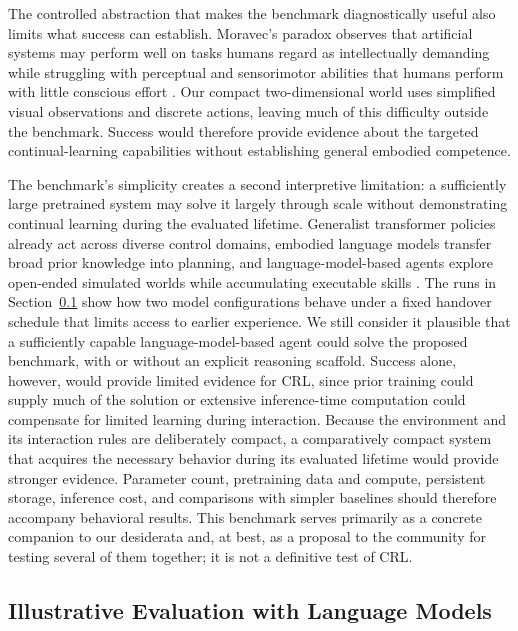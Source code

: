 \documentclass[10pt,journal,compsoc]{IEEEtran}
\begin{document}
The controlled abstraction that makes the benchmark diagnostically useful also limits what success can establish.
Moravec's paradox observes that artificial systems may perform well on tasks humans regard as intellectually demanding while struggling with perceptual and sensorimotor abilities that humans perform with little conscious effort \cite{moravec1988}.
Our compact two-dimensional world uses simplified visual observations and discrete actions, leaving much of this difficulty outside the benchmark.
Success would therefore provide evidence about the targeted continual-learning capabilities without establishing general embodied competence.

The benchmark's simplicity creates a second interpretive limitation: a sufficiently large pretrained system may solve it largely through scale without demonstrating continual learning during the evaluated lifetime.
Generalist transformer policies already act across diverse control domains, embodied language models transfer broad prior knowledge into planning, and language-model-based agents explore open-ended simulated worlds while accumulating executable skills \cite{reed2022,driess2023,wang2024b}.
The runs in Section~\ref{sec:companion-pilot} show how two model configurations behave under a fixed handover schedule that limits access to earlier experience.
We still consider it plausible that a sufficiently capable language-model-based agent could solve the proposed benchmark, with or without an explicit reasoning scaffold.
Success alone, however, would provide limited evidence for CRL, since prior training could supply much of the solution or extensive inference-time computation could compensate for limited learning during interaction.
Because the environment and its interaction rules are deliberately compact, a comparatively compact system that acquires the necessary behavior during its evaluated lifetime would provide stronger evidence.
Parameter count, pretraining data and compute, persistent storage, inference cost, and comparisons with simpler baselines should therefore accompany behavioral results.
This benchmark serves primarily as a concrete companion to our desiderata and, at best, as a proposal to the community for testing several of them together; it is not a definitive test of CRL.

\subsection{Illustrative Evaluation with Language Models}
\label{sec:companion-pilot}
\end{document}
